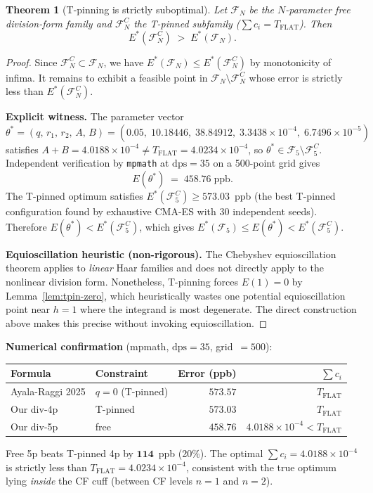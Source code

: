 \documentclass[12pt]{article}
\newtheorem{theorem}{Theorem}[section]
\begin{document}
\begin{theorem}[T-pinning is strictly suboptimal]\label{thm:tpin}
Let $\mathcal{F}_N$ be the $N$-parameter free division-form family and $\mathcal{F}_N^C$ the
T-pinned subfamily ($\sum c_i = T_{\mathrm{FLAT}}$).  Then
\[
E^*(\mathcal{F}_N^C) \;>\; E^*(\mathcal{F}_N).
\]
\end{theorem}

\begin{proof}
Since $\mathcal{F}_N^C \subset \mathcal{F}_N$, we have $E^*(\mathcal{F}_N) \leq E^*(\mathcal{F}_N^C)$
by monotonicity of infima.  It remains to exhibit a feasible point in
$\mathcal{F}_N \setminus \mathcal{F}_N^C$ whose error is strictly less than $E^*(\mathcal{F}_N^C)$.

\noindent\textbf{Explicit witness.}  The parameter vector
\[
\theta^* = (q,\,r_1,\,r_2,\,A,\,B)
= (0.05,\;10.18446,\;38.84912,\;3.3438{\times}10^{-4},\;6.7496{\times}10^{-5})
\]
satisfies $A+B = 4.0188{\times}10^{-4} \neq T_{\mathrm{FLAT}} = 4.0234{\times}10^{-4}$,
so $\theta^*\in\mathcal{F}_5\setminus\mathcal{F}_5^C$.
Independent verification by \texttt{mpmath} at $\mathrm{dps}=35$ on a 500-point grid gives
\[
E(\theta^*) \;=\; 458.76\;\mathrm{ppb}.
\]
The T-pinned optimum satisfies $E^*(\mathcal{F}_5^C) \geq 573.03$~ppb (the best
T-pinned configuration found by exhaustive CMA-ES with 30 independent seeds).
Therefore $E(\theta^*) < E^*(\mathcal{F}_5^C)$, which gives
$E^*(\mathcal{F}_5) \leq E(\theta^*) < E^*(\mathcal{F}_5^C)$.

\noindent\textbf{Equioscillation heuristic (non-rigorous).}  The Chebyshev equioscillation
theorem applies to \emph{linear} Haar families and does not directly apply to the
nonlinear division form.  Nonetheless, T-pinning forces $E(1)=0$ by
Lemma~\ref{lem:tpin-zero}, which heuristically wastes one potential equioscillation
point near $h=1$ where the integrand is most degenerate.  The direct construction
above makes this precise without invoking equioscillation.
\end{proof}

\noindent\textbf{Numerical confirmation} (mpmath, $\mathrm{dps}=35$, grid~$=500$):
\begin{center}
\begin{tabular}{llrr}
\toprule
Formula & Constraint & Error (ppb) & $\sum c_i$ \\
\midrule
Ayala-Raggi 2025 & $q=0$ (T-pinned) & $573.57$ & $T_{\mathrm{FLAT}}$ \\
Our div-4p       & T-pinned & $573.03$ & $T_{\mathrm{FLAT}}$ \\
Our div-5p       & free     & $\mathbf{458.76}$ & $4.0188{\times}10^{-4} < T_{\mathrm{FLAT}}$ \\
\bottomrule
\end{tabular}
\end{center}
Free 5p beats T-pinned 4p by $\mathbf{114}$~ppb (20\%).  The optimal $\sum c_i = 4.0188{\times}10^{-4}$
is strictly less than $T_{\mathrm{FLAT}} = 4.0234{\times}10^{-4}$, consistent with the true optimum
lying \emph{inside} the CF cuff (between CF levels $n=1$ and $n=2$).
\end{document}
